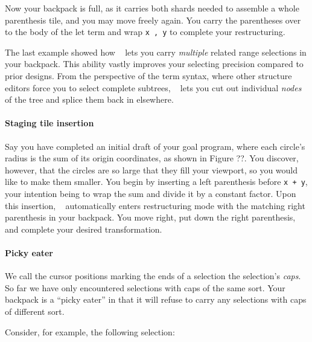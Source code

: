
Now your backpack is full, as it carries both shards
needed to assemble a whole parenthesis tile,
and you may move freely again.
You carry the parentheses over to the body of the
let term and wrap \texttt{x , y} to complete your
restructuring.

The last example showed how \tylr~ lets you carry \emph{multiple}
related range selections in your backpack.
This ability vastly improves your selecting precision
compared to prior designs.
From the perspective of the term syntax,
where other structure editors force you to select
complete subtrees, \tylr~ lets you cut out individual
\emph{nodes} of the tree and splice them back in
elsewhere.

\paragraph{Staging tile insertion}
Say you have completed an initial draft of your goal program,
where each circle's radius is the sum of its origin
coordinates, as shown in Figure ??.
You discover, however, that the circles are so large that
they fill your viewport, so you would like to make them smaller.
You begin by inserting a left parenthesis
before \texttt{x + y}, your intention being to wrap
the sum and divide it by a constant factor.
Upon this insertion, \tylr~ automatically enters
restructuring mode with the matching right parenthesis
in your backpack.
You move right, put down the right parenthesis,
and complete your desired transformation.



\paragraph{Picky eater}
We call the cursor positions marking the ends of a selection
the selection's \emph{caps}.
So far we have only encountered selections with caps
of the same sort.
Your backpack is a ``picky eater'' in that
it will refuse to carry any selections with caps of
different sort.

Consider, for example, the following selection:


